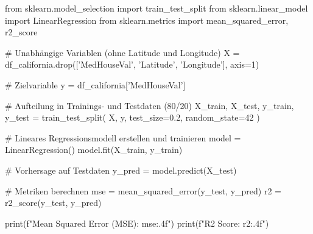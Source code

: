 from sklearn.model_selection import train_test_split
from sklearn.linear_model import LinearRegression
from sklearn.metrics import mean_squared_error, r2_score

# Unabhängige Variablen (ohne Latitude und Longitude)
X = df_california.drop(['MedHouseVal', 'Latitude', 'Longitude'], axis=1)

# Zielvariable
y = df_california['MedHouseVal']

# Aufteilung in Trainings- und Testdaten (80/20)
X_train, X_test, y_train, y_test = train_test_split(
    X, y, test_size=0.2, random_state=42
)

# Lineares Regressionsmodell erstellen und trainieren
model = LinearRegression()
model.fit(X_train, y_train)

# Vorhersage auf Testdaten
y_pred = model.predict(X_test)

# Metriken berechnen
mse = mean_squared_error(y_test, y_pred)
r2 = r2_score(y_test, y_pred)

print(f"Mean Squared Error (MSE): {mse:.4f}")
print(f"R2 Score: {r2:.4f}")